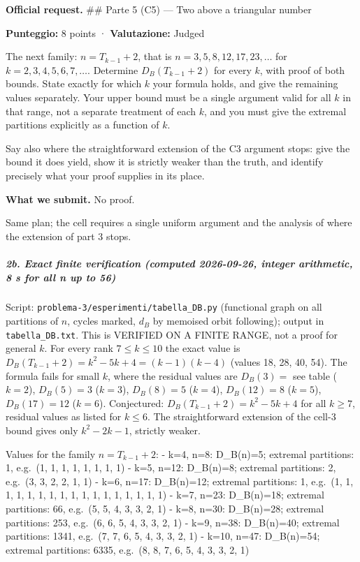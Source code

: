 
\textbf{Official request.} \#\# Parte 5 (C5) --- Two above a triangular
number

\textbf{Punteggio:} 8 points · \textbf{Valutazione:} Judged

The next family: \(n = T_{k-1} + 2\), that is
\(n = 3, 5, 8, 12, 17, 23, \ldots\) for
\(k = 2, 3, 4, 5, 6, 7, \ldots\). Determine \(D_B(T_{k-1} + 2)\) for
every \(k\), with proof of both bounds. State exactly for which \(k\)
your formula holds, and give the remaining values separately. Your upper
bound must be a single argument valid for all \(k\) in that range, not a
separate treatment of each \(k\), and you must give the extremal
partitions explicitly as a function of \(k\).

Say also where the straightforward extension of the C3 argument stops:
give the bound it does yield, show it is strictly weaker than the truth,
and identify precisely what your proof supplies in its place.

\textbf{What we submit.} No proof.


Same plan; the cell requires a single uniform argument and the analysis
of where the extension of part 3 stops.

\subparagraph{2b. Exact finite verification (computed 2026-09-26,
integer arithmetic, 8 s for all n up to
56)}\label{b.-exact-finite-verification-computed-2026-09-26-integer-arithmetic-8-s-for-all-n-up-to-56}

Script: \texttt{problema-3/esperimenti/tabella\_DB.py} (functional graph
on all partitions of \(n\), cycles marked, \(d_B\) by memoised orbit
following); output in \texttt{tabella\_DB.txt}. This is VERIFIED ON A
FINITE RANGE, not a proof for general \(k\). For every rank
\(7\le k\le 10\) the exact value is
\(D_B(T_{k-1}+2)=k^2-5k+4=(k-1)(k-4)\) (values 18, 28, 40, 54). The
formula fails for small \(k\), where the residual values are \(D_B(3)=\)
see table (\(k=2\)), \(D_B(5)=3\) (\(k=3\)), \(D_B(8)=5\) (\(k=4\)),
\(D_B(12)=8\) (\(k=5\)), \(D_B(17)=12\) (\(k=6\)). Conjectured:
\(D_B(T_{k-1}+2)=k^2-5k+4\) for all \(k\ge7\), residual values as listed
for \(k\le6\). The straightforward extension of the cell-3 bound gives
only \(k^2-2k-1\), strictly weaker.

Values for the family \(n=T_{k-1}+2\): - k=4, n=8: D\_B(n)=5; extremal
partitions: 1, e.g.~(1, 1, 1, 1, 1, 1, 1, 1) - k=5, n=12: D\_B(n)=8;
extremal partitions: 2, e.g.~(3, 3, 2, 2, 1, 1) - k=6, n=17: D\_B(n)=12;
extremal partitions: 1, e.g.~(1, 1, 1, 1, 1, 1, 1, 1, 1, 1, 1, 1, 1, 1,
1, 1, 1) - k=7, n=23: D\_B(n)=18; extremal partitions: 66, e.g.~(5, 5,
4, 3, 3, 2, 1) - k=8, n=30: D\_B(n)=28; extremal partitions: 253,
e.g.~(6, 6, 5, 4, 3, 3, 2, 1) - k=9, n=38: D\_B(n)=40; extremal
partitions: 1341, e.g.~(7, 7, 6, 5, 4, 3, 3, 2, 1) - k=10, n=47:
D\_B(n)=54; extremal partitions: 6335, e.g.~(8, 8, 7, 6, 5, 4, 3, 3, 2,
1)


